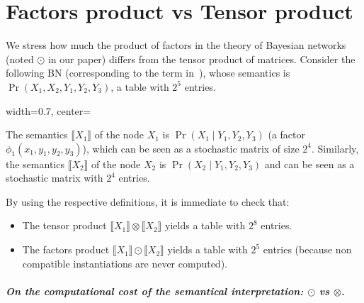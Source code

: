 \documentclass[10pt,a4paper]{article}
\newcommand{\den}[1]{\llbracket{#1}\rrbracket}
\begin{document}
\appendix

\section{Factors product vs Tensor product}
\label{app:cost}\label{app:section2}


We stress how much the product of factors in the theory of Bayesian networks (noted $\odot$ in our paper) differs from the tensor product of matrices. 
Consider the following BN (corresponding to the term in~\cite[Example 9.7]{popl24}), whose semantics is $\Pr(X_1, X_2,Y_1,Y_2,Y_3)$, a table with $2^5$ entries.

\begin{adjustbox}{width=0.7\linewidth, center=\linewidth}
\end{adjustbox}
The semantics $\den{X_1}$ of the node $X_1$ is $\Pr(X_1 \mid Y_1,Y_2,Y_3)$ (a factor $\phi_1(x_1,y_1,y_2,y_3)$), which can be seen as a stochastic matrix of size $2^4$.
Similarly, the semantics $\den{X_2}$ of the node $X_2$ is $\Pr(X_2 \mid Y_1,Y_2,Y_3)$ and can be seen as a stochastic matrix with $2^4$ entries.

By using the respective definitions, it is immediate to check that:
\begin{itemize}
\item
The tensor product $\den {X_1} \otimes \den {X_2} $ yields a table with $2^8$ entries.
\item
The factors product $\den {X_1} \odot \den {X_2} $ yields a table with $2^5$ entries (because non compatible instantiations are never computed).
\end{itemize}

\subparagraph{On the computational cost of the semantical interpretation: $\odot$ vs $\otimes$.}
\end{document}
